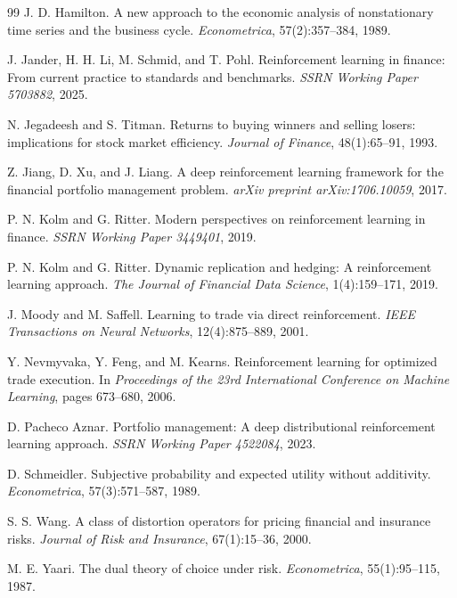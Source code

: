 \documentclass[10pt,twocolumn]{article}
\begin{document}
\begin{thebibliography}{99}
J. D. Hamilton.
\newblock A new approach to the economic analysis of nonstationary time series
  and the business cycle.
\newblock \emph{Econometrica}, 57(2):357--384, 1989.

J. Jander, H. H. Li, M. Schmid, and T. Pohl.
\newblock Reinforcement learning in finance: From current practice to standards
  and benchmarks.
\newblock \emph{SSRN Working Paper 5703882}, 2025.

N. Jegadeesh and S. Titman.
\newblock Returns to buying winners and selling losers: implications for stock
  market efficiency.
\newblock \emph{Journal of Finance}, 48(1):65--91, 1993.

Z. Jiang, D. Xu, and J. Liang.
\newblock A deep reinforcement learning framework for the financial portfolio
  management problem.
\newblock \emph{arXiv preprint arXiv:1706.10059}, 2017.

P. N. Kolm and G. Ritter.
\newblock Modern perspectives on reinforcement learning in finance.
\newblock \emph{SSRN Working Paper 3449401}, 2019.

P. N. Kolm and G. Ritter.
\newblock Dynamic replication and hedging: A reinforcement learning approach.
\newblock \emph{The Journal of Financial Data Science}, 1(4):159--171, 2019.

J. Moody and M. Saffell.
\newblock Learning to trade via direct reinforcement.
\newblock \emph{IEEE Transactions on Neural Networks}, 12(4):875--889, 2001.

Y. Nevmyvaka, Y. Feng, and M. Kearns.
\newblock Reinforcement learning for optimized trade execution.
\newblock In \emph{Proceedings of the 23rd International Conference on Machine
  Learning}, pages 673--680, 2006.

D. Pacheco Aznar.
\newblock Portfolio management: A deep distributional reinforcement learning
  approach.
\newblock \emph{SSRN Working Paper 4522084}, 2023.


D. Schmeidler.
\newblock Subjective probability and expected utility without additivity.
\newblock \emph{Econometrica}, 57(3):571--587, 1989.

S. S. Wang.
\newblock A class of distortion operators for pricing financial and insurance risks.
\newblock \emph{Journal of Risk and Insurance}, 67(1):15--36, 2000.

M. E. Yaari.
\newblock The dual theory of choice under risk.
\newblock \emph{Econometrica}, 55(1):95--115, 1987.


\end{thebibliography}
\end{document}

